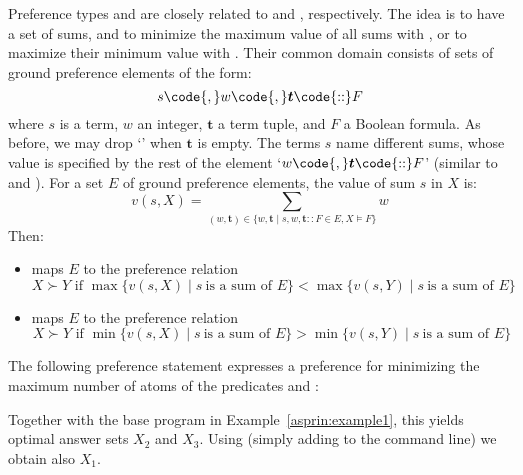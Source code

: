 Preference types  and  are 
closely related to  and , 
respectively.
%
The idea is to have a set of sums, 
and to minimize the maximum value of all sums with , 
or to maximize their minimum value with .
%
Their common domain consists of sets of ground preference elements of the form:
\[s\code{,}w\code{,}\boldsymbol{t}\code{::}F\]
where $s$ is a term, ${w}$ an integer, 
$\boldsymbol{t}$ a term tuple, and $F$ a Boolean formula.
%
As before, we may drop `\code{,}' when $\boldsymbol{t}$ is empty.
%
The terms $s$ name different sums,
whose value is specified by the rest of the element 
`$w\code{,}\boldsymbol{t}\code{::}F$'
(similar to  and ).
%
For a set $E$ of ground preference elements, 
the value of sum $s$ in $X$ is:
\[
v(s,X)=\sum_{(w,\boldsymbol{t})\in
\{w,\boldsymbol{t}\mid s,w,\boldsymbol{t}\mathtt{::}F\in E, X\models F\}}w
\]
Then:
\begin{itemize}
\item
{} maps $E$ to the preference relation%
\[
X \succ Y \text{ if } 
\max \{ v(s,X) \mid s \ \text{is a sum of } E \} < 
\max \{ v(s,Y) \mid s \ \text{is a sum of } E \} 
\]
\item
{} maps $E$ to the preference relation%
\[
X \succ Y \text{ if } 
\min \{ v(s,X) \mid s \ \text{is a sum of } E \} > 
\min \{ v(s,Y) \mid s \ \text{is a sum of } E \} 
\]
\end{itemize}
\begin{example}\label{asprin:minmaxexample}
%
%
The following preference statement 
expresses a preference for 
minimizing the maximum number of atoms of the predicates  and :
%

%
Together with the base program in Example~\ref{asprin:example1}, this yields optimal answer sets $X_2$ and $X_3$.
%
Using  (simply adding  to the command line) we obtain also $X_1$.
\end{example} %



